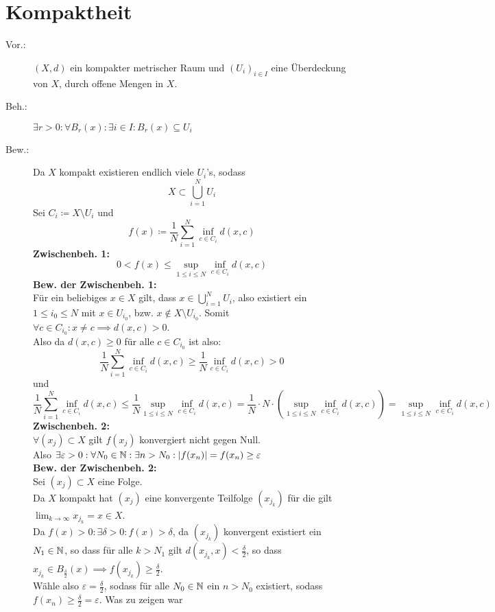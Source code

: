 \documentclass[sectionformat=aufgabe]{gadsescript}
\begin{document}
\section{Kompaktheit}
\begin{description}
	\item[Vor.:] $ (X, d) $ ein kompakter metrischer Raum und $ (U_i)_{i \in I}  $ eine Überdeckung von $ X $, durch offene Mengen in $ X $.
	\item[Beh.:] $ \exists r > 0: \forall B_{r}(x) : \exists i \in I : B_{r}(x) \subseteq U_i $
	\item[Bew.:] Da $ X $ kompakt existieren endlich viele $ U_i $'s, sodass
		\[
			X \subset \bigcup_{i = 1}^N U_i
		\]
		Sei $ C_i \coloneqq X\setminus U_i $ und
		\[
			f(x) \coloneqq \frac{ 1 }{ N } \sum_{i=1}^{N} \inf_{c \in C_i} d(x, c)
		\]
		\textbf{Zwischenbeh. 1:}
		\[
			0 < f(x) \leq \sup_{1 \leq i \leq N} \inf_{c \in C_i} d(x, c) 
		\]
		\textbf{Bew. der Zwischenbeh. 1:}\\
		Für ein beliebiges $ x \in X $ gilt, dass $ x \in \bigcup_{i = 1} ^N U_i $, also existiert ein $ 1 \leq i_0 \leq N $ mit $ x \in U_{i_0}  $, bzw. $ x \not\in X \setminus U_{i_0}  $.
		Somit $ \forall c \in C_{i_0} : x \neq  c \implies d(x, c) > 0 $.\\
		Also da $ d(x, c) \geq 0 $ für alle $ c \in C_{i_0}  $ ist also:
		\[
			\frac{ 1 }{ N } \sum_{i=1}^{N} \inf_{c \in C_i} d(x, c) \geq \frac{ 1 }{ N } \inf_{c \in C_i} d(x, c) > 0
		\]
		und
		\[
			\frac{ 1 }{ N } \sum_{i=1}^{N} \inf_{c \in C_i} d(x, c) \leq \frac{ 1 }{ N } \sup_{1 \leq i \leq N} \inf_{c \in C_{i} } d(x, c) 
			= \frac{ 1 }{ N } \cdot N \cdot \left( \sup_{1 \leq i \leq N} \inf_{c \in C_{i} } d(x, c) \right)
			= \sup_{1 \leq i \leq N} \inf_{c \in C_{i} } d(x, c)
		\]
		\textbf{Zwischenbeh. 2:}\\
		$ \forall (x_j) \subset X $ gilt $ f(x_j) $ konvergiert nicht gegen Null.\\
		Also $ \exists \varepsilon > 0 : \forall N_0 \in \mathbb{N} : \exists n > N_0 : | f(x_n) | = f(x_n) \geq  \varepsilon  $\\
		\textbf{Bew. der Zwischenbeh. 2:}\\
		Sei $ (x_j) \subset X $ eine Folge.\\
		Da $ X $ kompakt hat $ (x_j) $ eine konvergente Teilfolge $ (x_{j_k} ) $ für die gilt $ \lim_{k \to \infty} x_{j_k} = x \in X $.\\
		Da $ f(x) > 0 : \exists \delta > 0 : f(x) > \delta $,
		da $ (x_{j_k} ) $ konvergent existiert ein $ N_1 \in \mathbb{N}  $,
		so dass für alle $ k > N_1  $ gilt $ d(x_{j_k}, x) < \frac{ \delta }{ 2 }   $,
		so dass $ x_{j_k} \in B_{\frac{ \delta }{ 2 } }(x) \implies f(x_{j_k} ) \geq \frac{ \delta }{ 2 }  $.\\
		Wähle also $ \varepsilon = \frac{ \delta }{ 2 }  $, sodass für alle $ N_0 \in \mathbb{N}  $ ein $ n > N_0 $ existiert, sodass $ f(x_n) \geq \frac{ \delta }{ 2 } = \varepsilon  $. Was zu zeigen war


\end{description}
\end{document}
